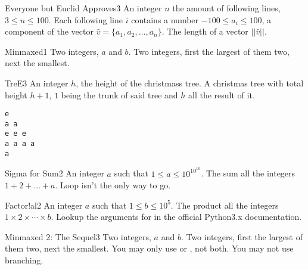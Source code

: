 \begin{task}{Everyone but Euclid Approves}{3}
\In
An integer $n$ the amount of following lines, $3 \leq n \leq 100$. 
Each following line $i$ contains a number $-100 \leq a_i \leq 100$, a 
component of the vector $\hat{v} = \{a_1, a_2, \dots, a_n\}$.
\Out
The length of a vector $||\hat{v}||$.
\end{task}

\begin{task}{Minmaxed}{1}
\In
Two integers, $a$ and $b$.
\Out
Two integers, first the largest of them two, next the smallest.
\end{task}

\begin{task}{TreE}{3}
\In
An integer $h$, the height of the christmass tree.
\Out
A christmas tree with total height $h + 1$, $1$ being the trunk of said
tree and $h$ all the result of it.
\begin{verbatim}
e
a a
e e e 
a a a a
a
\end{verbatim}
\end{task}

\begin{task}{Sigma for Sum}{2}
\In
An integer $a$ such that $1 \leq a \leq 10^{10^{10}}$.
\Out
The sum all the integers $1 + 2 + \dots + a$.
\Hint
Loop isn't the only way to go.
\end{task}

\begin{task}{Factor!al}{2}
\In
An integer $a$ such that $1 \leq b \leq 10^{5}$.
\Out
The product all the integers $1 \times 2 \times \cdots \times b$.
\Hint
Lookup the arguments for  in the official Python3.x documentation.
\end{task}

\begin{task}{Minmaxed 2: The Sequel}{3}
\In
Two integers, $a$ and $b$.
\Out
Two integers, first the largest of them two, next the smallest.
\Note
You may  only use  or , not both. You may not use branching.
\end{task}
